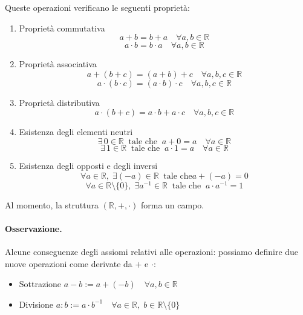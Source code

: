 \documentclass[oneside,10pt]{book} %
\begin{document}
Queste operazioni verificano le seguenti proprietà:
\begin{enumerate}
  \renewcommand{\labelenumi}{a\theenumi}

  \item Proprietà commutativa
  \[
    a + b = b + a \quad \forall a, b \in \mathbb{R}
  \]
  \[
    a \cdot b = b \cdot a \quad \forall a, b \in \mathbb{R}
  \]

  \item Proprietà associativa
  \[
    a + (b + c) = (a + b) + c \quad \forall a, b, c \in \mathbb{R}
  \]
  \[
    a \cdot (b \cdot c) = (a \cdot b) \cdot c \quad \forall a, b, c \in \mathbb{R}
  \]

  \item Proprietà distributiva
  \[
    a \cdot (b + c) = a \cdot b + a \cdot c \quad \forall a, b, c \in \mathbb{R}
  \]

  \item Esistenza degli elementi neutri
  \[
    \exists\, 0 \in \mathbb{R} \;\; \text{tale che} \;\; a + 0 = a \quad \forall a \in \mathbb{R}
  \]
  \[
    \exists\, 1 \in \mathbb{R} \;\; \text{tale che} \;\; a \cdot 1 = a \quad \forall a \in \mathbb{R}
  \]

  \item Esistenza degli opposti e degli inversi
  \[
    \forall a \in \mathbb{R}, \; \exists (-a) \in \mathbb{R} \;\; \text{tale che} a+(-a) = 0
  \]
  \[
    \forall a \in \mathbb{R}\setminus \{0\}, \; \exists a^{-1} \in \mathbb{R} \;\; \text{tale che} \;\; a \cdot a^{-1} = 1
  \]
\end{enumerate}

Al momento, la struttura $(\mathbb{R}, +, \cdot)$ forma un campo.

\paragraph{Osservazione.}
Alcune conseguenze degli assiomi relativi alle operazioni:
possiamo definire due nuove operazioni come derivate da $+$ e $\cdot$:

\begin{itemize}
\item Sottrazione \quad $a - b := a + (-b) \quad \forall a, b \in \mathbb{R}$
\item Divisione \quad $a : b := a \cdot b^{-1} \quad \forall a \in \mathbb{R}, \; b \in \mathbb{R}\setminus \{0\}$
\end{itemize}

\end{document}
